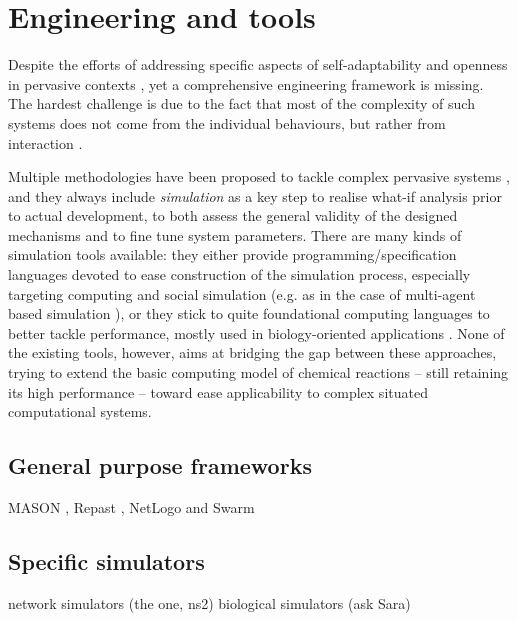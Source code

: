 \documentclass[12pt,a4paper,twoside,openright]{book}
\begin{document}
\section{Engineering and tools}
\label{engineering-and-tools}

Despite the efforts of addressing specific aspects of self-adaptability and openness in pervasive contexts \cite{Mam06,BabaogluPatterns,facets}, yet a comprehensive engineering framework is missing.
%
The hardest challenge is due to the fact that most of the complexity of such systems does not come from the individual behaviours, but rather from interaction \cite{Wegner,interactionbook,interaction-interbook}.


Multiple methodologies have been proposed to tackle complex pervasive systems \cite{MCOV-SCP2011,BabulakIJOE2008,BandiniJASSS2009,josMacalN10,sapere-procedia7}, and they always include \emph{simulation} as a key step  to realise what-if analysis prior to actual development, to both assess the general validity of the designed mechanisms and to fine tune system parameters.
There are many kinds of simulation tools available: they either provide programming/specification languages devoted to ease construction of the simulation process, especially targeting computing and social simulation (e.g. as in the case of multi-agent based simulation \cite{BandiniJASSS2009,SchumacherCEEMAS2007,vizzari-massimulationbook09,repast,sklar2007al}), or they stick to quite foundational computing languages to better tackle performance, mostly used in biology-oriented applications \cite{Priami1995,murata1989,UhrmacherWSC2005,EwaldJOS2007}.
%
None of the existing tools, however, aims at bridging the gap between these approaches, trying to extend the basic computing model of chemical reactions -- still retaining its high performance -- toward ease applicability to complex situated computational systems.



\subsection{General purpose frameworks}
MASON \cite{luke2005simulation}, Repast \cite{repast}, NetLogo \cite{sklar2007al} and Swarm
\subsection{Specific simulators}
network simulators (the one, ns2)
biological simulators (ask Sara)
\end{document}

